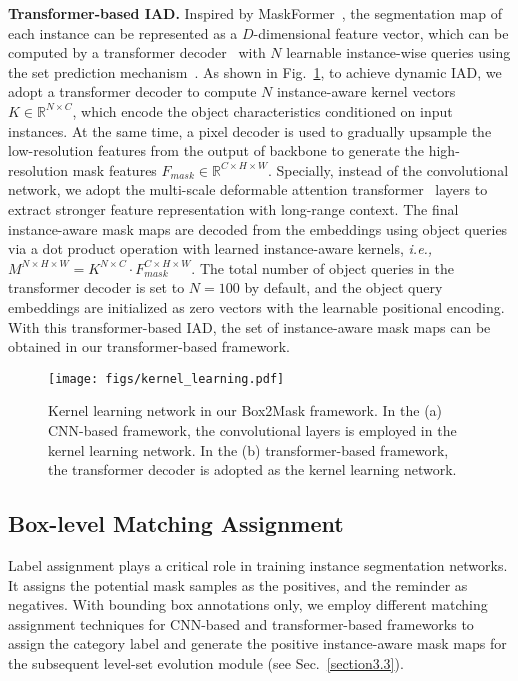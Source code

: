 \documentclass[12pt,onecolumn,letterpaper]{article}
\begin{document}
\textbf{Transformer-based IAD.}
Inspired by MaskFormer~\cite{nips2021maskformer}, 
the segmentation map of each instance can be represented as a $D$-dimensional feature vector, which can be computed by a transformer decoder~\cite{nips2017attention} with $N$ learnable instance-wise queries using the set prediction mechanism~\cite{eccv2020-detr}.
As shown in Fig.~\ref{fig:kernellearning}, 
to achieve dynamic IAD, we adopt a transformer decoder to compute $N$ instance-aware kernel vectors $K\in{\mathbb{R}^{N \times C}}$, which encode the object characteristics conditioned on input instances.
At the same time, a pixel decoder is used to gradually upsample the low-resolution features from the output of backbone to generate the high-resolution mask features $F_{mask}\in{\mathbb{R}^{C \times H \times W}} $. Specially, instead of the convolutional network, we adopt the multi-scale deformable attention transformer~\cite{zhu2020deformable} layers to extract stronger feature representation with long-range context.
The final instance-aware mask maps are decoded from the embeddings using object queries via a dot product operation with learned instance-aware kernels, \textit{i.e.,} 
${M^{N \times H \times W}} = {K^{N \times C}} \cdot F_{mask}^{C \times H \times W}$.  The total number of object queries in the transformer decoder is set to $N=100$ by default, and the object query embeddings are initialized as zero vectors with the learnable positional encoding.
With this transformer-based IAD, the set of instance-aware mask maps can be obtained in our transformer-based framework.

\begin{figure}[t]
	\centering
	\texttt{[image: figs/kernel\_learning.pdf]}
	\caption{Kernel learning network in our Box2Mask framework. In the (a) CNN-based framework, the convolutional layers is employed in the kernel learning network. In the (b) transformer-based framework, the transformer decoder is adopted as the kernel learning network.}
	\label{fig:kernellearning}
\end{figure}

\subsection{Box-level Matching Assignment} 
Label assignment plays a critical role in training instance segmentation networks. It assigns the potential mask samples as the positives, and the reminder as negatives. With bounding box annotations only, we employ different matching assignment techniques for CNN-based and transformer-based frameworks to assign the category label and generate the positive instance-aware mask maps for the subsequent level-set evolution module (see Sec.~\ref{section3.3}).
\end{document}
